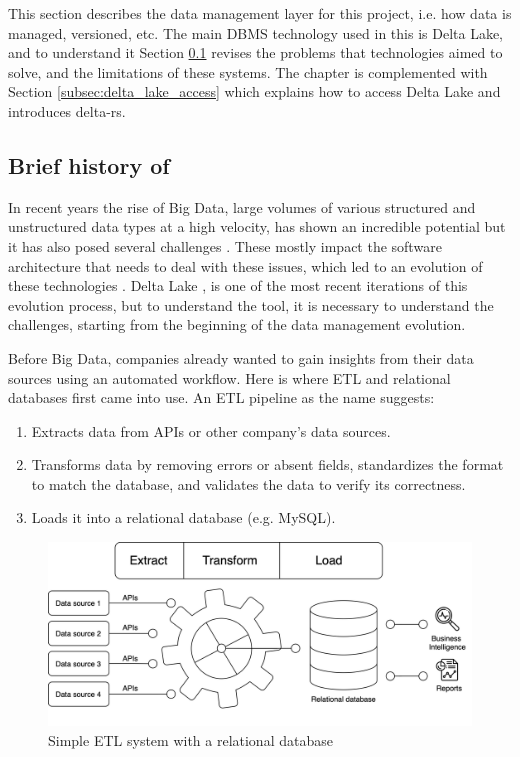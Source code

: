 This section describes the data management layer for this project, i.e. how data is managed, versioned, etc. The main \gls{DBMS} technology used in this is Delta Lake, and to understand it Section \ref{subsec:history_DBMS} revises the problems that technologies aimed to solve, and the limitations of these systems. The chapter is complemented with Section \ref{subsec:delta_lake_access} which explains how to access Delta Lake and introduces delta-rs.

\subsection{Brief history of }
\label{subsec:history_DBMS}

In recent years the rise of Big Data, large volumes of various structured and unstructured data types at a high velocity, has shown an incredible potential but it has also posed several challenges \cite{penceWhatBigData2014}. These mostly impact the software architecture that needs to deal with these issues, which led to an evolution of these technologies \cite{gortonDistributionDataDeployment2015}. Delta Lake \cite{armbrustDeltaLakeHighperformance2020}, is one of the most recent iterations of this evolution process, but to understand the tool, it is necessary to understand the challenges, starting from the beginning of the data management evolution.

Before Big Data, companies already wanted to gain insights from their data sources using an automated workflow. Here is where \gls{ETL} and relational databases first came into use. An \gls{ETL} pipeline as the name suggests:
\begin{enumerate}
    \item Extracts data from \glspl{API} or other company's data sources.
    \item Transforms data by removing errors or absent fields, standardizes the format to match the database, and validates the data to verify its correctness.
    \item Loads it into a relational database (e.g. MySQL).
\end{enumerate} 

\begin{figure}[!ht]
    \begin{center}
      \includegraphics[width=\textwidth]{figures/2-background/DeltaLake_evolution-ETL+DB.png}
    \end{center}
    \caption{Simple \gls{ETL} system with a relational database}
    \label{fig:ETL+DB}
\end{figure}

